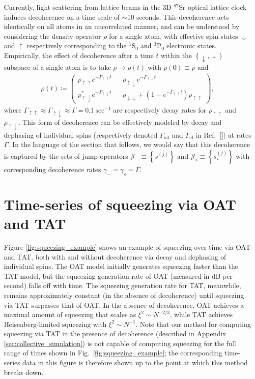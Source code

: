 \documentclass[aps,prx,superscriptaddress,notitlepage,twocolumn,longbibliography]{revtex4-2}
\renewcommand{\t}{\text} %
\newcommand{\p}[1]{\left(#1\right)} %
\renewcommand{\set}[1]{\left\{#1\right\}} %
\newcommand{\J}{\mathcal{J}}
\newcommand{\z}{\text{z}}
\newcommand{\up}{\uparrow}
\newcommand{\dn}{\downarrow}
\begin{document}
Currently, light scattering from lattice beams in the 3D $^{87}$Sr optical lattice clock induces decoherence on a time scale of $\sim$10 seconds\cite{goban2018emergence, hutson2019engineering}.
This decoherence acts identically on all atoms in an uncorrelated manner, and can be understood by considering the density operator $\rho$ for a single atom, with effective spin states $\dn$ and $\up$ respectively corresponding to the ${}^1\t{S}_0$ and ${}^3\t{P}_0$ electronic states.
Empirically, the effect of decoherence after a time $t$ within the $\set{\dn,\up}$ subspace of a single atom is to take $\rho\to\rho\p{t}$ with $\rho\p{0}\equiv\rho$ and
\begin{align}
  \rho\p{t} \coloneqq
  \begin{pmatrix}
  \rho_{\up\up} e^{-\Gamma_{\up\up}t} &&
  \rho_{\up\dn} e^{-\Gamma_{\up\dn}t} \\
  \rho_{\up\dn}^* e^{-\Gamma_{\up\dn}t} &&
  \rho_{\dn\dn} + \p{1-e^{-\Gamma_{\up\up}t}} \rho_{\up\up}
  \end{pmatrix},
  \label{eq:decay_matrix}
\end{align}
where $\Gamma_{\up\up}\approx\Gamma_{\up\dn}\approx\Gamma=0.1~\t{sec}^{-1}$ are respectively decay rates for $\rho_{\up\up}$ and $\rho_{\up\dn}$.
This form of decoherence can be effectively modeled by decay and dephasing of individual spins (respectively denoted $\Gamma_{\t{ud}}$ and $\Gamma_{\t{el}}$ in Ref.~[]) at rates $\Gamma$.
In the language of the section that follows, we would say that this decoherence is captured by the sets of jump operators $\J_-\equiv\set{s_-^{(j)}}$ and $\J_\z\equiv\set{s_\z^{(j)}}$ with corresponding decoherence rates $\gamma_-=\gamma_\z=\Gamma$.

\section{Time-series of squeezing via OAT and TAT}
\label{sec:time_series}
\setcounter{figure}{0}

Figure \ref{fig:squeezing_example} shows an example of squeezing over time via OAT and TAT, both with and without decoherence via decay and dephasing of individual spins.
The OAT model initially generates squeezing faster than the TAT model, but the squeezing generation rate of OAT (measured in dB per second) falls off with time.
The squeezing generation rate for TAT, meanwhile, remains approximately constant (in the absence of decoherence) until squeezing via TAT surpasses that of OAT.
In the absence of decoherence, OAT achieves a maximal amount of squeezing that scales as $\xi^2\sim N^{-2/3}$, while TAT achieves Heisenberg-limited squeezing with $\xi^2\sim N^{-1}$.
Note that our method for computing squeezing via TAT in the presence of decoherence (described in Appendix \ref{sec:collective_simulation}) is not capable of computing squeezing for the full range of times shown in Fig.~\ref{fig:squeezing_example}; the corresponding time-series data in this figure is therefore shown up to the point at which this method breaks down.
\end{document}
